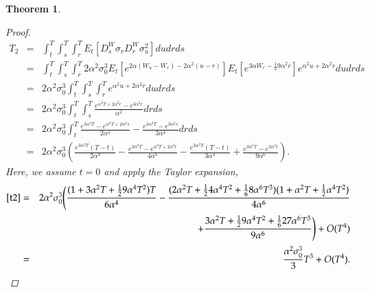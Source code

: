 \documentclass[11pt]{article}
\newtheorem{theorem}{Theorem}
\begin{document}
\begin{theorem}
\begin{proof}
\begin{eqnarray}
T_2 
&=& \int_{t}^{T} \int_{s}^{T} \int_{r}^{T} E_{t}\left[ D_{s}^{W}\sigma_{r}  D_{r}^{W}\sigma _{u}^{2} \right]du dr ds\nonumber\\
&=& \int_{t}^{T} \int_{s}^{T} \int_{r}^{T} 2\alpha^2 \sigma_0^3  E_{t}\left[ e^{2\alpha(W_u - W_r) - 2\alpha^2(u-r)}\right]E_{t}\left[ e^{3\alpha W_r - \frac12 9\alpha^2r}\right]e^{\alpha^2u + 2\alpha^2r}du dr ds\nonumber\\
&=& 2\alpha^2 \sigma_0^3 \int_{t}^{T} \int_{s}^{T} \int_{r}^{T} e^{\alpha^2u + 2\alpha^2r}du dr ds\nonumber\\
&=& 2\alpha^2 \sigma_0^3 \int_{t}^{T} \int_{s}^{T} \frac{e^{\alpha^2T + 2\alpha^2r} - e^{3\alpha^2r}}{\alpha^2} dr ds\nonumber\\
&=& 2\alpha^2 \sigma_0^3 \int_{t}^{T} \frac{e^{3\alpha^2T} - e^{\alpha^2T + 2\alpha^2s}}{2\alpha^4} - \frac{e^{3\alpha^2T} - e^{3\alpha^2s}}{3\alpha^4} dr ds\nonumber\\
&=& 2\alpha^2 \sigma_0^3 \left( \frac{e^{3\alpha^2T}(T-t)}{2\alpha^4} - \frac{e^{3\alpha^2T} - e^{\alpha^2T + 2\alpha^2t}}{4\alpha^6} - \frac{e^{3\alpha^2T}(T-t)}{3\alpha^4} + \frac{e^{3\alpha^2T} - e^{3\alpha^2t}}{9\alpha^6} \right).\label{t2}
\end{eqnarray}
Here, we assume $t=0$ and apply the Taylor expansion,
\begin{eqnarray}
\eqref{t2}
&=& 
2\alpha^2 \sigma_0^3  \Bigg(\frac{(1+3\alpha^2T+\frac{1}{2}9\alpha^4T^2)T}{6\alpha^4} - \frac{(2\alpha^2T + \frac{1}{2}4\alpha^4T^2 + \frac{1}{6}8\alpha^6T^3)(1 + \alpha^2T + \frac{1}{2}\alpha^4T^2)}{4\alpha^6}\nonumber\\
&& + \frac{3\alpha^2 T+ \frac{1}{2}9\alpha^4T^2+\frac{1}{6}27\alpha^6T^3}{9\alpha^6}\Bigg) +O(T^4)\nonumber\\
&=&
\frac{\alpha^2 \sigma_0^3}{3}T^3+O(T^4).
\end{eqnarray}


\end{proof}
\end{theorem}
\end{document}
